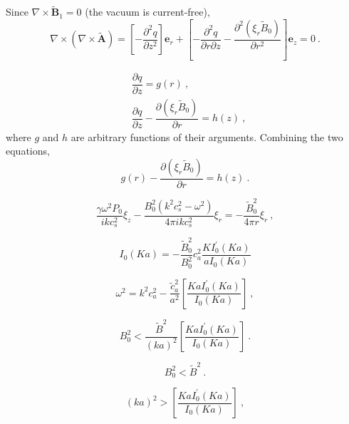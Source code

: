 \documentclass[12pt,a4paper]{article}
\renewcommand{\vec}[1]{\boldsymbol{#1}}
\begin{document}
Since $\nabla \times \vec{\tilde{B}}_1 = 0$ (the vacuum is current-free), 
\begin{equation*}
\nabla \times (\nabla \times \vec{\tilde{A}}) = \left[- \dfrac{\partial^2 q}{\partial z^2} \right] \vec{e}_r +\left[- \dfrac{\partial^2 q}{\partial r\partial z} -\dfrac{\partial^2 (\xi_r \tilde{B}_0)}{\partial r^2} \right] \vec{e}_z = 0 ~.
\end{equation*}


\begin{align*}
& \dfrac{\partial q}{\partial z} = g(r) ~, \\
& \dfrac{\partial q}{\partial z} -\dfrac{\partial (\xi_r \tilde{B}_0)}{\partial r} = h(z) ~,
\end{align*}
where $g$ and $h$ are arbitrary functions of their arguments. Combining the two equations,
\begin{equation*}
g(r) -\dfrac{\partial (\xi_r \tilde{B}_0)}{\partial r} = h(z) ~.
\end{equation*}


\begin{equation*}
\dfrac{\gamma \omega^2 P_0}{ikc^2_s} \xi_z -\dfrac{B_0^2(k^2 c_s^2 -\omega^2)}{4\pi ik c_s^2} \xi_r = -\dfrac{ \tilde{B}_0^2}{4\pi r} \xi_r ~,
\end{equation*}



\begin{equation*}
[c_s^2\omega^2 -c_a^2(k^2 c_s^2 -\omega^2) ]I_0(Ka) = -\dfrac{ \tilde{B}_0^2}{B_0^2} c_a^2 \dfrac{K I_0^\prime(Ka)}{a I_0(Ka)}
\end{equation*}

\begin{equation}
\omega^2 = k^2 c_a^2 -\dfrac{ \tilde{c}_a^2}{a^2} \left[\dfrac{KaI_0^\prime(Ka)}{I_0(Ka)} \right] ~,
\end{equation}


\begin{equation*}
B_0^2 < \dfrac{\tilde{B}^2}{(ka)^2} \left[\dfrac{KaI_0^\prime(Ka)}{I_0(Ka)} \right] ~.
\end{equation*}

\begin{equation*}
B_0^2 < \tilde{B}^2 ~.
\end{equation*}


\begin{equation*}
(ka)^2 > \left[\dfrac{KaI_0^\prime(Ka)}{I_0(Ka)} \right] ~,
\end{equation*}
\end{document}
